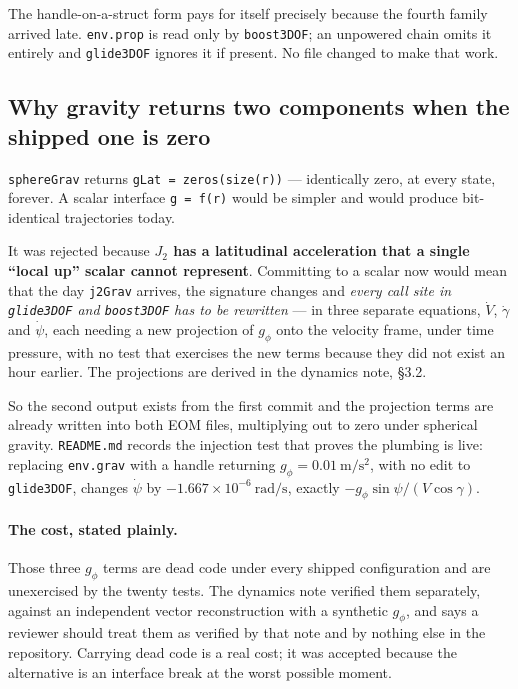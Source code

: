 \documentclass[11pt]{article}
\newcommand{\code}[1]{\texttt{#1}}
\begin{document}
The handle-on-a-struct form pays for itself precisely because the fourth
family arrived late. \code{env.prop} is read only by \code{boost3DOF}; an
unpowered chain omits it entirely and \code{glide3DOF} ignores it if present.
No file changed to make that work.

\subsection{Why gravity returns two components when the shipped one is zero}

\code{sphereGrav} returns \code{gLat = zeros(size(r))} --- identically zero, at
every state, forever. A scalar interface \code{g = f(r)} would be simpler and
would produce bit-identical trajectories today.

It was rejected because \textbf{$J_2$ has a latitudinal acceleration that a
single ``local up'' scalar cannot represent}. Committing to a scalar now would
mean that the day \code{j2Grav} arrives, the signature changes and
\emph{every call site in \code{glide3DOF} and \code{boost3DOF} has to be
rewritten} --- in three separate equations, $\dot V$, $\dot\gamma$ and
$\dot\psi$, each needing a new projection of $g_\phi$ onto the velocity frame,
under time pressure, with no test that exercises the new terms because they did
not exist an hour earlier. The projections are derived in the dynamics note,
\S3.2.

So the second output exists from the first commit and the projection terms are
already written into both EOM files, multiplying out to zero under spherical
gravity. \code{README.md} records the injection test that proves the plumbing
is live: replacing \code{env.grav} with a handle returning
$g_\phi = 0.01~\mathrm{m/s^2}$, with no edit to \code{glide3DOF}, changes
$\dot\psi$ by $-1.667\times10^{-6}~\mathrm{rad/s}$, exactly
$-g_\phi\sin\psi/(V\cos\gamma)$.

\paragraph{The cost, stated plainly.} Those three $g_\phi$ terms are dead code
under every shipped configuration and are unexercised by the twenty tests. The
dynamics note verified them separately, against an independent vector
reconstruction with a synthetic $g_\phi$, and says a reviewer should treat them
as verified by that note and by nothing else in the repository. Carrying dead
code is a real cost; it was accepted because the alternative is an interface
break at the worst possible moment.
\end{document}
